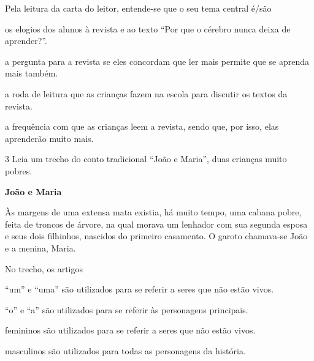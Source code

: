 Pela leitura da carta do leitor, entende-se que o seu tema central é/são

\begin{escolha}
\item os elogios dos alunos à revista e ao texto ``Por que o cérebro nunca 
deixa de aprender?''.

\item a pergunta para a revista se eles concordam que ler mais permite que
se aprenda mais também.

\item a roda de leitura que as crianças fazem na escola para discutir
os textos da revista.

\item a frequência com que as crianças leem a revista, sendo que, por
isso, elas aprenderão muito mais.
\end{escolha}

\num{3} Leia um trecho do conto tradicional ``João e Maria'', duas crianças muito pobres.

\begin{myquote}
\textbf{João e Maria}

Às margens de uma extensa mata existia, há muito tempo, uma cabana
pobre, feita de troncos de árvore, na qual morava um lenhador com sua
segunda esposa e seus dois filhinhos, nascidos do primeiro casamento. 
O garoto chamava-se João e a menina, Maria.

\end{myquote}

No trecho, os artigos

\begin{escolha}
\item ``um'' e ``uma'' são utilizados para se referir a seres que não estão vivos.

\item ``o'' e ``a'' são utilizados para se referir às personagens principais.

\item femininos são utilizados para se referir a seres que não estão vivos.

\item masculinos são utilizados para todas as personagens da história.
\end{escolha}

